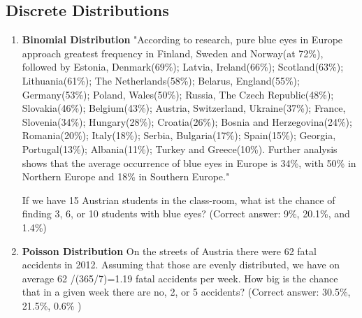 \subsection*{Discrete Distributions }

\begin{enumerate}
    \item \textbf{Binomial Distribution} "According to research, pure blue eyes in Europe approach greatest frequency in Finland, Sweden and Norway(at 72\%), followed by Estonia, Denmark(69\%); Latvia, Ireland(66\%); Scotland(63\%); Lithuania(61\%); The Netherlands(58\%); Belarus, England(55\%); Germany(53\%); Poland, Wales(50\%); Russia, The Czech Republic(48\%); Slovakia(46\%); Belgium(43\%); Austria, Switzerland, Ukraine(37\%); France, Slovenia(34\%); Hungary(28\%); Croatia(26\%); Bosnia and Herzegovina(24\%); Romania(20\%); Italy(18\%); Serbia, Bulgaria(17\%); Spain(15\%); Georgia, Portugal(13\%); Albania(11\%); Turkey and Greece(10\%). Further analysis shows that the average occurrence of blue eyes in Europe is 34\%, with 50\% in Northern Europe and 18\% in Southern Europe."

    If we have 15 Austrian students in the class-room, what ist the chance of finding 3, 6, or 10 students with blue eyes?
    (Correct answer: 9\%, 20.1\%, and 1.4\%)

    \item \textbf{Poisson Distribution} On the streets of Austria there were 62 fatal accidents in 2012. Assuming that those are evenly distributed, we have on average
    62 /(365/7)=1.19 fatal accidents per week. How big is the chance that in a given week there are no, 2, or 5 accidents?
    (Correct answer: 30.5\%, 21.5\%, 0.6\% )
\end{enumerate}
